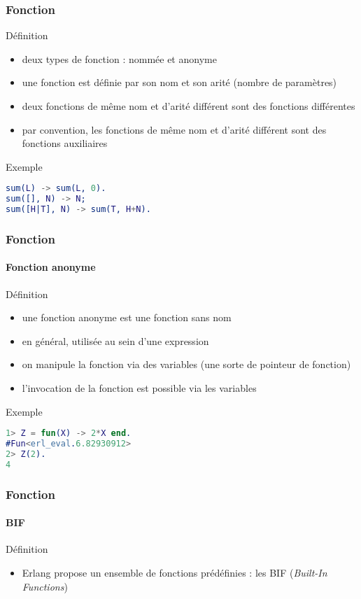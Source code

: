 \begin{frame}[fragile]
  \frametitle{Fonction}

  \begin{block}{Définition}
    \begin{itemize}
    \item deux types de fonction : nommée et anonyme
    \item une fonction est définie par son nom et son arité (nombre de
      paramètres)
    \item deux fonctions de même nom et d'arité différent sont des fonctions
      différentes
    \item par convention, les fonctions de même nom et d'arité différent sont
      des fonctions auxiliaires
    \end{itemize}
  \end{block}

  \begin{exampleblock}{Exemple}
    \begin{lstlisting}[language=erlang]
sum(L) -> sum(L, 0).
sum([], N) -> N;
sum([H|T], N) -> sum(T, H+N).
    \end{lstlisting}
  \end{exampleblock}

\end{frame}

\begin{frame}[fragile]
  \frametitle{Fonction}
  \framesubtitle{Fonction anonyme}

  \begin{block}{Définition}
    \begin{itemize}
    \item une fonction anonyme est une fonction sans nom
    \item en général, utilisée au sein d'une expression
    \item on manipule la fonction via des variables (une sorte de pointeur
      de fonction)
    \item l'invocation de la fonction est possible via les variables
    \end{itemize}
  \end{block}

  \begin{exampleblock}{Exemple}
    \begin{lstlisting}[language=erlang]
1> Z = fun(X) -> 2*X end.
#Fun<erl_eval.6.82930912>
2> Z(2).
4
   \end{lstlisting}
  \end{exampleblock}

\end{frame}

\begin{frame}[fragile]
  \frametitle{Fonction}
  \framesubtitle{BIF}

  \begin{block}{Définition}
    \begin{itemize}
    \item Erlang propose un ensemble de fonctions prédéfinies : les BIF
      (\textit{Built-In Functions})
    \end{itemize}
  \end{block}

\end{frame}
